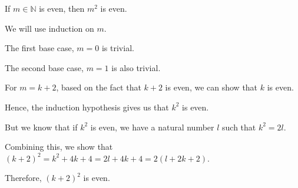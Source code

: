If $m \in \mathbb{N}$ is even, then $m^2$ is even.

We will use induction on $m$.

The first base case, $m=0$ is trivial.

The second base case, $m=1$ is also trivial.

For $m = k+2$, based on the fact that $k+2$ is even, we can show that $k$ is even.

Hence, the induction hypothesis gives us that $k^2$ is even.

But we know that if $k^2$ is even, we have a natural number $l$ such that $k^2 = 2l$.

Combining this, we show that $(k+2)^2 = k^2 + 4k + 4 = 2l + 4k + 4 = 2(l+2k+2)$.

Therefore, $(k+2)^2$ is even.